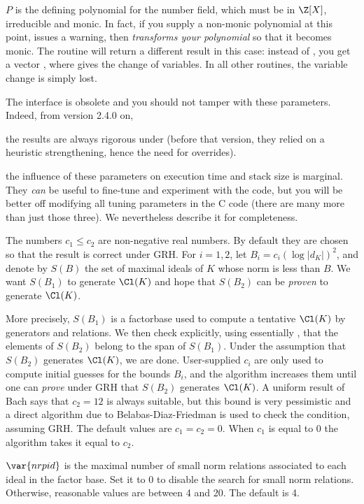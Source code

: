 $P$ is the defining polynomial for the number field, which must be in
$\Z[X]$, irreducible and monic. In fact, if you supply a non-monic polynomial
at this point,  issues a warning, then \emph{transforms your
polynomial} so that it becomes monic. The  routine
will return a different result in this case: instead of , you get a
vector , where  gives the change
of variables. In all other routines, the variable change is simply lost.

The  interface is obsolete and you should not tamper with
these parameters. Indeed, from version 2.4.0 on,

\item the results are always rigorous under  (before that version,
they relied on a heuristic strengthening, hence the need for overrides).

\item the influence of these parameters on execution time and stack size is
marginal. They \emph{can} be useful to fine-tune and experiment with the
 code, but you will be better off modifying all tuning
parameters in the C code (there are many more than just those three).
We nevertheless describe it for completeness.

The numbers $c_1 \leq c_2$ are non-negative real numbers. By default they are
chosen so that the result is correct under GRH. For $i = 1,2$, let
$B_i = c_i(\log |d_K|)^2$, and denote by $S(B)$ the set of maximal ideals of
$K$ whose norm is less than $B$. We want $S(B_1)$ to generate $\Cl(K)$ and hope
that $S(B_2)$ can be \emph{proven} to generate $\Cl(K)$.

More precisely, $S(B_1)$ is a factorbase used to compute a tentative
$\Cl(K)$ by generators and relations. We then check explicitly, using
essentially , that the elements of $S(B_2)$ belong to the
span of $S(B_1)$. Under the assumption that $S(B_2)$ generates $\Cl(K)$, we
are done. User-supplied $c_i$ are only used to compute initial guesses for
the bounds $B_i$, and the algorithm increases them until one can \emph{prove}
under GRH that $S(B_2)$ generates $\Cl(K)$. A uniform result of Bach says
that $c_2 = 12$ is always suitable, but this bound is very pessimistic and a
direct algorithm due to Belabas-Diaz-Friedman is used to check the condition,
assuming GRH. The default values are $c_1 = c_2 = 0$. When $c_1$ is equal to
$0$ the algorithm takes it equal to $c_2$.

$\var{nrpid}$ is the maximal number of small norm relations associated to each
ideal in the factor base. Set it to $0$ to disable the search for small norm
relations. Otherwise, reasonable values are between 4 and 20. The default is
4.

